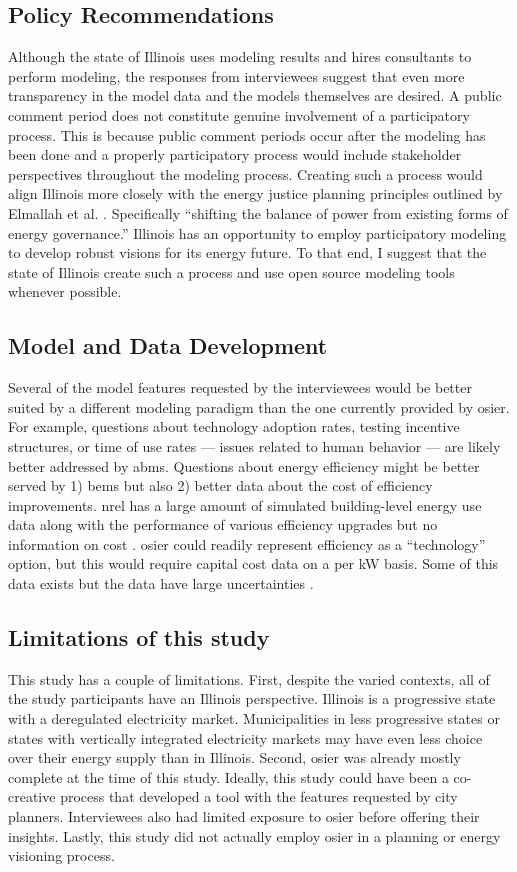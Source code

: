 \subsection{Policy Recommendations}
Although the state of Illinois uses modeling results and hires consultants to
perform modeling, the responses from interviewees suggest that even more
transparency in the model data and the models themselves are desired. A public
comment period does not constitute genuine involvement of a participatory
process. This is because public comment periods occur after the modeling has
been done and a properly participatory process would include stakeholder
perspectives throughout the modeling process. Creating such a process would
align Illinois more closely with the energy justice planning principles outlined
by Elmallah et al. \cite{elmallah_frontlining_2022}. Specifically ``shifting the
balance of power from existing forms of energy governance.'' Illinois has an
opportunity to employ participatory modeling to develop robust visions for its
energy future. To that end, I suggest that the state of Illinois create such a
process and use open source modeling tools whenever possible.

\subsection{Model and Data Development}
Several of the model features requested by the interviewees would be better
suited by a different modeling paradigm than the one currently provided by
\ac{osier}. For example, questions about technology adoption rates, testing
incentive structures, or time of use rates --- issues related to human behavior
--- are likely better addressed by \acp{abm}. Questions about energy efficiency
might be better served by 1) \acp{bem} but also 2) better data about the cost of
efficiency improvements. \ac{nrel} has a large amount of simulated
building-level energy use data along with the performance of various efficiency
upgrades but no information on cost \cite{wilson_end-use_2022}. \ac{osier} could
readily represent efficiency as a ``technology'' option, but this would require
capital cost data on a per kW basis. Some of this data exists but the data have
large uncertainties \cite{less_cost_2021}.


\subsection{Limitations of this study}
This study has a couple of limitations. First, despite the varied contexts, all
of the study participants have an Illinois perspective. Illinois is a
progressive state with a deregulated electricity market. Municipalities in less
progressive states or states with vertically integrated electricity markets may
have even less choice over their energy supply than in Illinois. Second,
\ac{osier} was already mostly complete at the time of this study. Ideally, this
study could have been a co-creative process that developed a tool with the
features requested by city planners. Interviewees also had limited exposure to
\ac{osier} before offering their insights. Lastly, this study did not actually
employ \ac{osier} in a planning or energy visioning process.